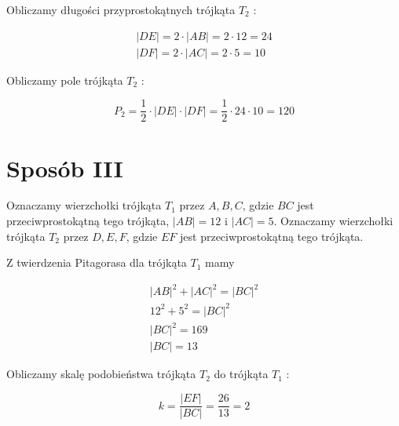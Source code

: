 \documentclass[10pt]{article}
\begin{document}
Obliczamy długości przyprostokątnych trójkąta $T_{2}$ :

$$
\begin{gathered}
|D E|=2 \cdot|A B|=2 \cdot 12=24 \\
|D F|=2 \cdot|A C|=2 \cdot 5=10
\end{gathered}
$$

Obliczamy pole trójkąta $T_{2}$ :

$$
P_{2}=\frac{1}{2} \cdot|D E| \cdot|D F|=\frac{1}{2} \cdot 24 \cdot 10=120
$$

\section*{Sposób III}
Oznaczamy wierzchołki trójkąta $T_{1}$ przez $A, B, C$, gdzie $B C$ jest przeciwprostokątną tego trójkąta, $|A B|=12$ i $|A C|=5$. Oznaczamy wierzchołki trójkąta $T_{2}$ przez $D, E, F$, gdzie $E F$ jest przeciwprostokątną tego trójkąta.

Z twierdzenia Pitagorasa dla trójkąta $T_{1}$ mamy

$$
\begin{gathered}
|A B|^{2}+|A C|^{2}=|B C|^{2} \\
12^{2}+5^{2}=|B C|^{2} \\
|B C|^{2}=169 \\
|B C|=13
\end{gathered}
$$

Obliczamy skalę podobieństwa trójkąta $T_{2}$ do trójkąta $T_{1}$ :

$$
k=\frac{|E F|}{|B C|}=\frac{26}{13}=2
$$
\end{document}
